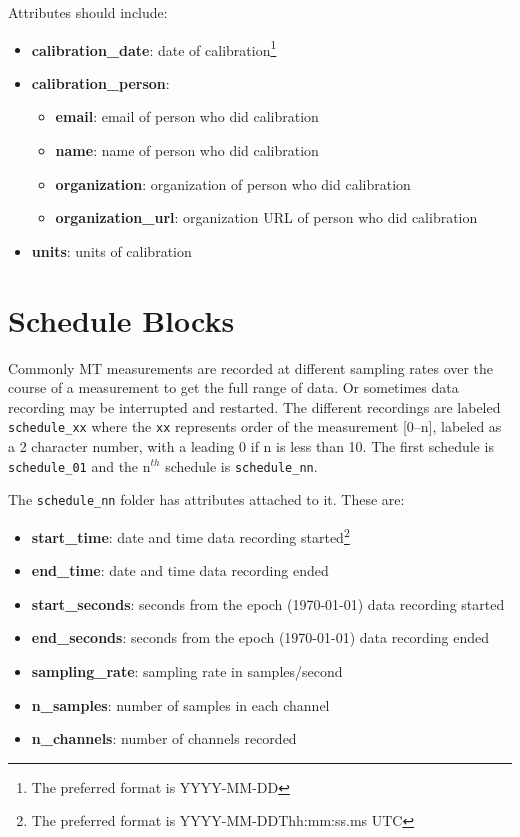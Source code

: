 \documentclass{article}
\newcommand{\attr}[1]{\textbf{#1}}
\begin{document}
Attributes should include:
\begin{itemize}
	\setlength{\itemsep}{.1em}
	\item \attr{calibration\_date}: date of calibration\footnote[1]{The preferred format is YYYY-MM-DD}
	\item \attr{calibration\_person}:
	\begin{itemize}
		\setlength{\itemsep}{.05em}
		\item \attr{email}: email of person who did calibration
		\item \attr{name}: name of person who did calibration
		\item \attr{organization}: organization of person who did calibration
		\item \attr{organization\_url}: organization URL of person who did calibration
	\end{itemize} 
	\item \attr{units}: units of calibration
\end{itemize} 

\section{Schedule Blocks}

Commonly MT measurements are recorded at different sampling rates over the course of a measurement to get the full range of data.  Or sometimes data recording may be interrupted and restarted.  The different recordings are labeled \verb|schedule_xx| where the \verb|xx| represents order of the measurement [0--n], labeled as a 2 character number, with a leading 0 if n is less than 10.  The first schedule is \verb|schedule_01| and the n$^{th}$ schedule is \verb|schedule_nn|. 

The \verb|schedule_nn| folder has attributes attached to it.  These are:

\begin{itemize}
	\setlength{\itemsep}{.1em}
	\item \attr{start\_time}: date and time data recording started\footnote[1]{The preferred format is YYYY-MM-DDThh:mm:ss.ms UTC}
	\item \attr{end\_time}: date and time data recording ended\footnotemark[1]
	\item \attr{start\_seconds}: seconds from the epoch (1970-01-01) data recording started
	\item \attr{end\_seconds}: seconds from the epoch (1970-01-01) data recording ended
	\item \attr{sampling\_rate}: sampling rate in samples/second
	\item \attr{n\_samples}: number of samples in each channel
	\item \attr{n\_channels}: number of channels recorded
\end{itemize}  

   
\end{document}
